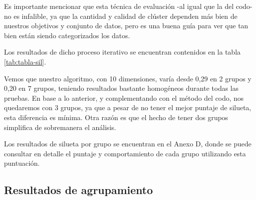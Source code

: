 \documentclass[
  12pt,
  letterpaper,
]{article}
\begin{document}
Es importante mencionar que esta técnica de evaluación -al igual que la del codo- no es infalible, ya que la cantidad y calidad de clúster dependen más bien de nuestros objetivos y conjunto de datos, pero es una buena guía para ver que tan bien están siendo categorizados los datos.

Los resultados de dicho proceso iterativo se encuentran contenidos en la tabla \ref{tab:tabla-sil}.

\begin{table}[!h]
\centering
\caption{\label{tab:tabla-sil}Puntaje de silueta según número de clústers (K = 2 a 10)}
\centering
{}
\end{table}

Vemos que nuestro algoritmo, con 10 dimensiones, varía desde 0,29 en 2 grupos y 0,20 en 7 grupos, teniendo resultados bastante homogéneos durante todas las pruebas.
En base a lo anterior, y complementando con el método del codo, nos quedaremos con 3 grupos, ya que a pesar de no tener el mejor puntaje de silueta, esta diferencia es mínima.
Otra razón es que el hecho de tener dos grupos simplifica de sobremanera el análisis.

Los resultados de silueta por grupo se encuentran en el Anexo D, donde se puede consultar en detalle el puntaje y comportamiento de cada grupo utilizando esta puntuación.

\subsection{Resultados de agrupamiento}\label{resultados-de-agrupamiento}
\end{document}
